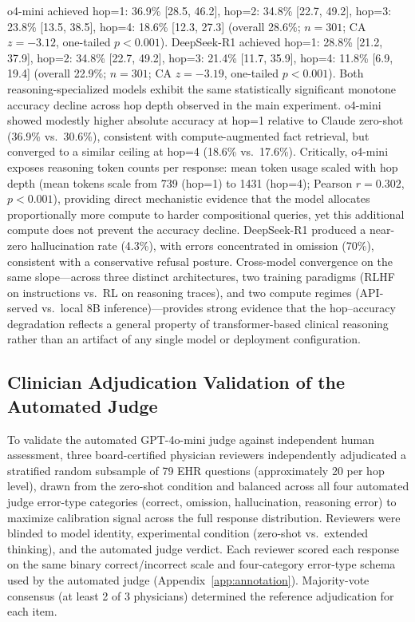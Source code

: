 \documentclass{article}
\begin{document}
o4-mini achieved hop=1: 36.9\% [28.5, 46.2], hop=2: 34.8\% [22.7, 49.2], hop=3: 23.8\% [13.5, 38.5], hop=4: 18.6\% [12.3, 27.3] (overall 28.6\%; $n = 301$; CA $z = -3.12$, one-tailed $p < 0.001$). DeepSeek-R1 achieved hop=1: 28.8\% [21.2, 37.9], hop=2: 34.8\% [22.7, 49.2], hop=3: 21.4\% [11.7, 35.9], hop=4: 11.8\% [6.9, 19.4] (overall 22.9\%; $n = 301$; CA $z = -3.19$, one-tailed $p < 0.001$). Both reasoning-specialized models exhibit the same statistically significant monotone accuracy decline across hop depth observed in the main experiment. o4-mini showed modestly higher absolute accuracy at hop=1 relative to Claude zero-shot (36.9\% vs.~30.6\%), consistent with compute-augmented fact retrieval, but converged to a similar ceiling at hop=4 (18.6\% vs.~17.6\%). Critically, o4-mini exposes reasoning token counts per response: mean token usage scaled with hop depth (mean tokens scale from 739 (hop=1) to 1431 (hop=4); Pearson $r = 0.302$, $p < 0.001$), providing direct mechanistic evidence that the model allocates proportionally more compute to harder compositional queries, yet this additional compute does not prevent the accuracy decline. DeepSeek-R1 produced a near-zero hallucination rate (4.3\%), with errors concentrated in omission (70\%), consistent with a conservative refusal posture. Cross-model convergence on the same slope---across three distinct architectures, two training paradigms (RLHF on instructions vs.\ RL on reasoning traces), and two compute regimes (API-served vs.\ local 8B inference)---provides strong evidence that the hop--accuracy degradation reflects a general property of transformer-based clinical reasoning rather than an artifact of any single model or deployment configuration.

\subsection{Clinician Adjudication Validation of the Automated Judge}
\label{app:clinician_adjudication}

To validate the automated GPT-4o-mini judge against independent human assessment,
three board-certified physician reviewers independently adjudicated a stratified
random subsample of 79 EHR questions (approximately 20 per hop level), drawn from
the zero-shot condition and balanced across all four automated judge error-type
categories (correct, omission, hallucination, reasoning error) to maximize
calibration signal across the full response distribution.
Reviewers were blinded to model identity, experimental condition (zero-shot vs.\
extended thinking), and the automated judge verdict.
Each reviewer scored each response on the same binary correct/incorrect scale and
four-category error-type schema used by the automated judge (Appendix~\ref{app:annotation}).
Majority-vote consensus (at least 2 of 3 physicians) determined the reference
adjudication for each item.
\end{document}
